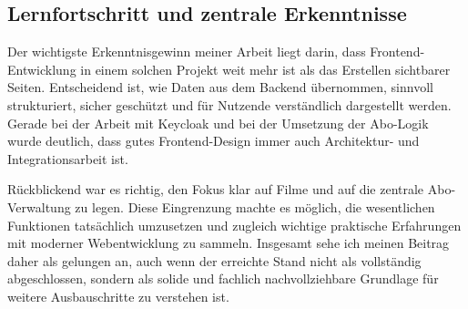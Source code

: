 \subsection{Lernfortschritt und zentrale Erkenntnisse}
Der wichtigste Erkenntnisgewinn meiner Arbeit liegt darin, dass Frontend-Entwicklung in einem solchen Projekt weit mehr ist als das Erstellen sichtbarer Seiten. Entscheidend ist, wie Daten aus dem Backend übernommen, sinnvoll strukturiert, sicher geschützt und für Nutzende verständlich dargestellt werden. Gerade bei der Arbeit mit Keycloak und bei der Umsetzung der Abo-Logik wurde deutlich, dass gutes Frontend-Design immer auch Architektur- und Integrationsarbeit ist.

Rückblickend war es richtig, den Fokus klar auf Filme und auf die zentrale Abo-Verwaltung zu legen. Diese Eingrenzung machte es möglich, die wesentlichen Funktionen tatsächlich umzusetzen und zugleich wichtige praktische Erfahrungen mit moderner Webentwicklung zu sammeln. Insgesamt sehe ich meinen Beitrag daher als gelungen an, auch wenn der erreichte Stand nicht als vollständig abgeschlossen, sondern als solide und fachlich nachvollziehbare Grundlage für weitere Ausbauschritte zu verstehen ist.

